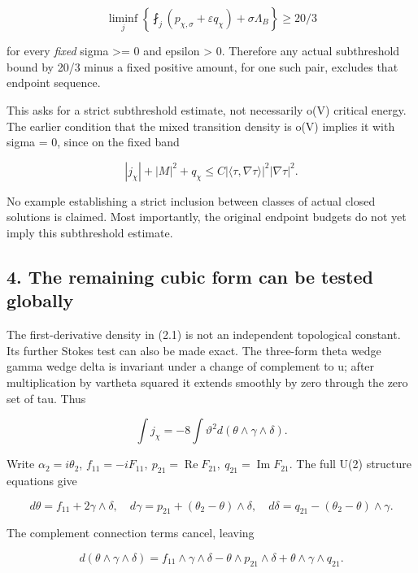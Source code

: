 \documentclass[
  10pt,
]{article}
\begin{document}
\[
 \boxed{\liminf_j\left\{
     \fint_j(p_{\chi,\sigma}+\varepsilon q_\chi)
                              +\sigma\Lambda_B\right\}\ge20/3}
                                                               \tag{3.5}
\]

for every \emph{fixed} sigma \textgreater= 0 and epsilon \textgreater{}
0. Therefore any actual subthreshold bound by 20/3 minus a fixed
positive amount, for one such pair, excludes that endpoint sequence.

This asks for a strict subthreshold estimate, not necessarily o(V)
critical energy. The earlier condition that the mixed transition density
is o(V) implies it with sigma = 0, since on the fixed band

\[
 |j_\chi|+|M|^2+q_\chi
           \le C|\langle\tau,\nabla\tau\rangle|^2|\nabla\tau|^2.
\]

No example establishing a strict inclusion between classes of actual
closed solutions is claimed. Most importantly, the original endpoint
budgets do not yet imply this subthreshold estimate.

\hypertarget{the-remaining-cubic-form-can-be-tested-globally}{%
\subsection{4. The remaining cubic form can be tested
globally}\label{the-remaining-cubic-form-can-be-tested-globally}}

The first-derivative density in (2.1) is not an independent topological
constant. Its further Stokes test can also be made exact. The three-form
theta wedge gamma wedge delta is invariant under a change of complement
to u; after multiplication by vartheta squared it extends smoothly by
zero through the zero set of tau. Thus

\[
 \int j_\chi=-8\int\vartheta^2d(\theta\wedge\gamma\wedge\delta).
                                                               \tag{4.1}
\]

Write \(\alpha_2=i\theta_2\),
\(f_{11}=-iF_{11},\ p_{21}=\operatorname{Re}F_{21},\
q_{21}=\operatorname{Im}F_{21}\). The full U(2) structure equations give

\[
 d\theta=f_{11}+2\gamma\wedge\delta,\quad
 d\gamma=p_{21}+(\theta_2-\theta)\wedge\delta,\quad
 d\delta=q_{21}-(\theta_2-\theta)\wedge\gamma.
\]

The complement connection terms cancel, leaving

\[
 d(\theta\wedge\gamma\wedge\delta)
 =f_{11}\wedge\gamma\wedge\delta-\theta\wedge p_{21}\wedge\delta
                                   +\theta\wedge\gamma\wedge q_{21}.
                                                               \tag{4.2}
\]
\end{document}
